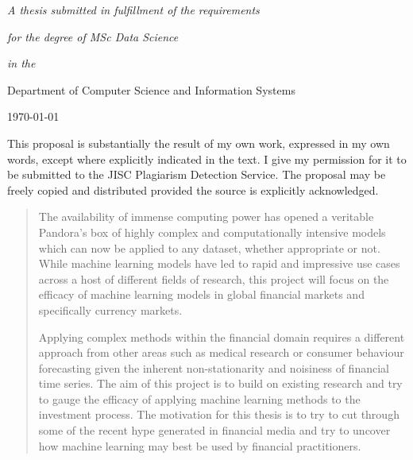 \documentclass[11pt]{article}
\begin{document}
\begin{titlepage}
\centerline{\textit{A thesis submitted in fulfillment of the requirements} }      
\centerline{\textit{for the degree of MSc Data Science}} 
\centerline{\textit{in the}}

\begin{center}
\textcolor{brickred}{Department of Computer Science and Information Systems}
\end{center}
	
	\vfill\vfill\vfill %
	
	{\large\today} %
	

This proposal is substantially the result of my own work, expressed in my own words, except where explicitly indicated in the text. I give my permission for it to be submitted to the JISC Plagiarism Detection Service.
The proposal may be freely copied and distributed provided the source is explicitly acknowledged.
	 
	
	\vfill %
	
\end{titlepage}
\clearpage
\vspace{8mm}
\vfill
\begin{abstract}
\par
The availability of immense computing power has opened a veritable Pandora's box of highly complex and computationally intensive models which can now be applied to any dataset, whether appropriate or not. While machine learning models have led to rapid and impressive use cases across a host of different fields of research, this project will focus on the efficacy of machine learning models in global financial markets and specifically currency markets. \par 
Applying complex methods within the financial domain requires a different approach from other areas such as medical research or consumer behaviour forecasting  given the inherent non-stationarity and noisiness of financial time series. The aim of this project is to build on existing research and try to gauge the efficacy of applying machine learning methods to the investment process. The motivation for this thesis is to try to cut through some of the recent hype generated in financial media and try to uncover how machine learning may best be used by financial practitioners.  

\end{abstract}
\end{document}
